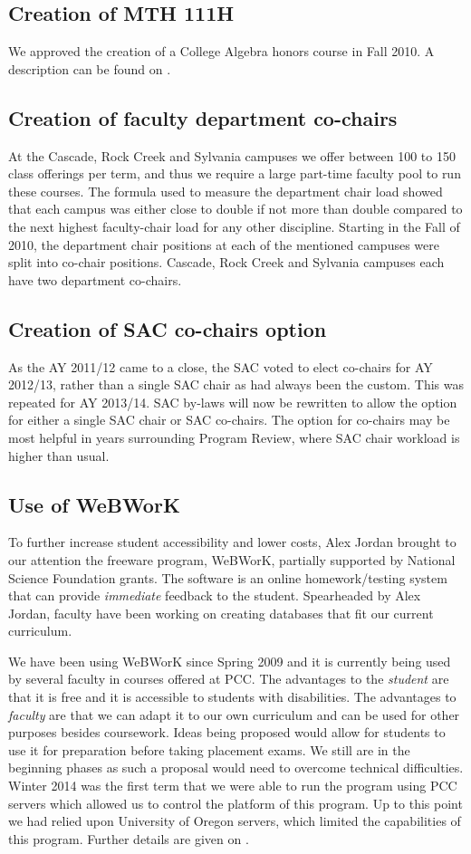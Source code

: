 \subsection{Creation of MTH 111H} We approved the creation of a College Algebra honors
course in Fall 2010.   A description can be found on .
\subsection{Creation of faculty department co-chairs} At the Cascade, Rock Creek and Sylvania campuses we
offer between 100 to 150 class offerings per term, and
thus we require a large part-time faculty pool to run these courses.    The
formula used to measure the department chair load showed that each campus
was either close to double if not more than double compared to the next
highest faculty-chair load for any other discipline.   Starting in the Fall
of 2010, the department chair positions at each of the mentioned campuses
were split into co-chair positions.   Cascade, Rock Creek and Sylvania
campuses each have two department co-chairs.
\subsection{Creation of SAC co-chairs option} As the AY 2011/12 came to a close, the SAC voted to elect
co-chairs for AY 2012/13, rather than a single SAC chair as had always been the custom.
This was repeated for AY 2013/14. SAC by-laws will now be rewritten to allow the option for either
a single SAC chair or SAC co-chairs. The option for co-chairs may be most helpful in years surrounding
Program Review, where SAC chair workload is higher than usual.
\subsection{Use of WeBWorK} To further increase student accessibility and lower costs,
Alex Jordan brought to our attention the freeware program,
WeBWorK,  partially supported by  National Science Foundation grants.    The
software is an online homework/testing
system that can provide \emph{immediate} feedback to the student.   Spearheaded by Alex
Jordan, faculty have been working on creating databases that fit our current
curriculum.

We have been using WeBWorK since Spring 2009 and it is currently being used by several faculty in courses
offered at PCC.  The advantages to the \emph{student} are that it is free and it is
accessible to students with disabilities.   The advantages to \emph{faculty} are that
we can adapt it to our own curriculum and can be used for other purposes
besides coursework.   Ideas being proposed would allow for students to
use it for preparation before taking placement exams.  We still are in the
beginning phases as such a proposal would need to overcome technical
difficulties.   Winter 2014 was the first term that we were able to
run the program using PCC servers which allowed us to control the platform
of this program.  Up to this point we had relied upon University of Oregon
servers, which limited the capabilities of this program. Further details
are given on .
